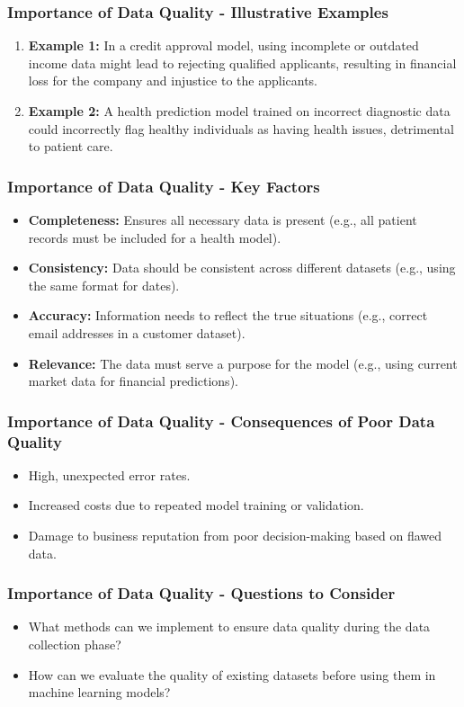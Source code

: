 \documentclass[aspectratio=169]{beamer}
\begin{document}
\begin{frame}[fragile]
    \frametitle{Importance of Data Quality - Illustrative Examples}
    \begin{enumerate}
        \item \textbf{Example 1:} 
            In a credit approval model, using incomplete or outdated income data might lead to rejecting qualified applicants, resulting in financial loss for the company and injustice to the applicants.
        \item \textbf{Example 2:} 
            A health prediction model trained on incorrect diagnostic data could incorrectly flag healthy individuals as having health issues, detrimental to patient care.
    \end{enumerate}
\end{frame}

\begin{frame}[fragile]
    \frametitle{Importance of Data Quality - Key Factors}
    \begin{itemize}
        \item \textbf{Completeness:} Ensures all necessary data is present (e.g., all patient records must be included for a health model).
        \item \textbf{Consistency:} Data should be consistent across different datasets (e.g., using the same format for dates).
        \item \textbf{Accuracy:} Information needs to reflect the true situations (e.g., correct email addresses in a customer dataset).
        \item \textbf{Relevance:} The data must serve a purpose for the model (e.g., using current market data for financial predictions).
    \end{itemize}
\end{frame}

\begin{frame}[fragile]
    \frametitle{Importance of Data Quality - Consequences of Poor Data Quality}
    \begin{itemize}
        \item High, unexpected error rates.
        \item Increased costs due to repeated model training or validation.
        \item Damage to business reputation from poor decision-making based on flawed data.
    \end{itemize}
\end{frame}

\begin{frame}[fragile]
    \frametitle{Importance of Data Quality - Questions to Consider}
    \begin{itemize}
        \item What methods can we implement to ensure data quality during the data collection phase?
        \item How can we evaluate the quality of existing datasets before using them in machine learning models?
    \end{itemize}
\end{frame}
\end{document}

